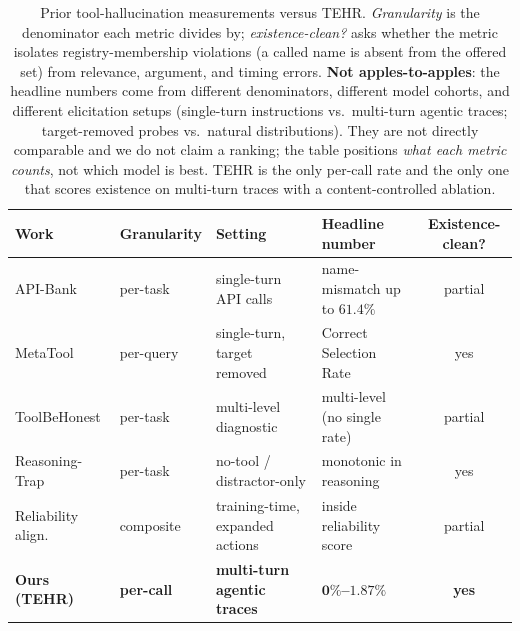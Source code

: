 \begin{table}[t]
\caption{Prior tool-hallucination measurements versus TEHR. \emph{Granularity}
is the denominator each metric divides by; \emph{existence-clean?} asks whether
the metric isolates registry-membership violations (a called name is absent from
the offered set) from relevance, argument, and timing errors. \textbf{Not
apples-to-apples}: the headline numbers come from different denominators,
different model cohorts, and different elicitation setups (single-turn
instructions vs.\ multi-turn agentic traces; target-removed probes vs.\ natural
distributions). They are not directly comparable and we do not claim a ranking;
the table positions \emph{what each metric counts}, not which model is best.
TEHR is the only per-call rate and the only one that scores existence on
multi-turn traces with a content-controlled ablation.}
\label{tab:priorart}
\centering
\small
\setlength{\tabcolsep}{5pt}
\begin{tabular}{llllc}
\toprule
Work & Granularity & Setting & Headline number & Existence-clean? \\
\midrule
API-Bank \citep{li2023apibank}
  & per-task
  & single-turn API calls
  & name-mismatch up to $61.4\%$
  & partial \\
MetaTool \citep{huang2024metatool}
  & per-query
  & single-turn, target removed
  & Correct Selection Rate
  & yes \\
ToolBeHonest \citep{toolbehonest2024}
  & per-task
  & multi-level diagnostic
  & multi-level (no single rate)
  & partial \\
Reasoning-Trap \citep{yin2026reasoningtrap}
  & per-task
  & no-tool / distractor-only
  & monotonic in reasoning
  & yes \\
Reliability align.\ \citep{cao2025reliability}
  & composite
  & training-time, expanded actions
  & inside reliability score
  & partial \\
\midrule
\textbf{Ours (TEHR)}
  & \textbf{per-call}
  & \textbf{multi-turn agentic traces}
  & $\mathbf{0\%}$\textbf{--}$\mathbf{1.87\%}$
  & \textbf{yes} \\
\bottomrule
\end{tabular}
\end{table}
